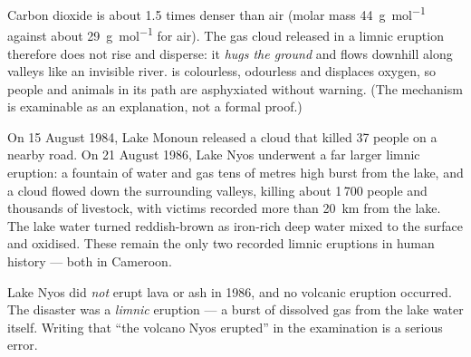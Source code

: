 \documentclass[11pt]{article}
\begin{document}
\begin{propriete}
Carbon dioxide is about 1.5 times denser than air (molar mass \SI{44}{g.mol^{-1}} against about \SI{29}{g.mol^{-1}} for air). The gas cloud released in a limnic eruption therefore does not rise and disperse: it \emph{hugs the ground} and flows downhill along valleys like an invisible river.  is colourless, odourless and displaces oxygen, so people and animals in its path are asphyxiated without warning. (The mechanism is examinable as an explanation, not a formal proof.)
\end{propriete}

\begin{experience}
On 15 August 1984, Lake Monoun released a  cloud that killed 37 people on a nearby road. On 21 August 1986, Lake Nyos underwent a far larger limnic eruption: a fountain of water and gas tens of metres high burst from the lake, and a  cloud flowed down the surrounding valleys, killing about 1\,700 people and thousands of livestock, with victims recorded more than \SI{20}{km} from the lake. The lake water turned reddish-brown as iron-rich deep water mixed to the surface and oxidised. These remain the only two recorded limnic eruptions in human history --- both in Cameroon.
\end{experience}

\begin{attention}
Lake Nyos did \emph{not} erupt lava or ash in 1986, and no volcanic eruption occurred. The disaster was a \emph{limnic} eruption --- a burst of dissolved gas from the lake water itself. Writing that ``the volcano Nyos erupted'' in the examination is a serious error.
\end{attention}
\end{document}

